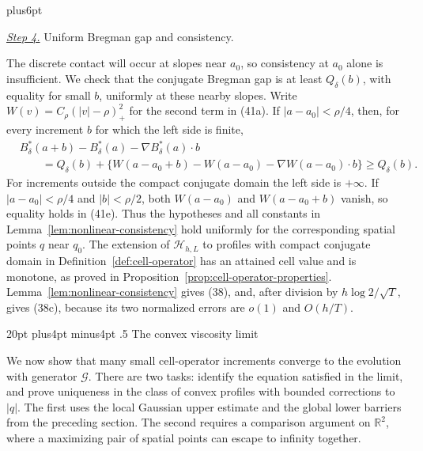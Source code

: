 \documentclass[11pt,reqno]{amsart}
\makeatletter
\def\section{\@startsection{section}{1}{0pt}%
  {20pt plus4pt minus4pt}
  {.5\linespacing}
  {\normalfont\bfseries}}
\theoremstyle{plain}
\theoremstyle{definition}
\theoremstyle{remark}
\renewenvironment{proof}[1][\proofname]{%
  \par
  \pushQED{\qed}%
  \normalfont
  \topsep6pt plus6pt\relax
  \trivlist
  \item[\hskip\labelsep\slshape #1\@addpunct{.}]%
  \ignorespaces
}{%
  \popQED
  \endtrivlist
  \@endpefalse
}
\DeclareRobustCommand{\qed}{%
  \leavevmode\unskip\penalty9999\hbox{}\nobreak
  \ifmmode
    \makebox[0pt][l]{\qquad\hbox{\qedsymbol}}%
  \else
    \qquad\hbox{\qedsymbol}%
  \fi
}
\renewcommand{\qedsymbol}{\rule[.47pt]{4pt}{6pt}}
\numberwithin{equation}{section}
\newcommand{\1}{\mathbf 1}
\makeatother
\begin{document}
\begin{proof}
\smallskip\noindent
\underline{\textit{Step 4.}} Uniform Bregman gap and consistency.

The discrete contact will occur at slopes near $a_0$, so consistency
at $a_0$ alone is insufficient.  We check that the conjugate Bregman
gap is at least $Q_\delta(b)$, with equality for small $b$, uniformly
at these nearby slopes.  Write
$W(v)=C_\rho(|v|-\rho)_+^2$ for the second term in (41a).
If $|a-a_0|<\rho/4$, then, for every increment
$b$ for which the left side is finite,
\begin{equation}
\begin{split}
&B_ \delta^*(a+b)-B_ \delta^*(a)
-\nabla B_ \delta^*(a)\cdot b\\
&\qquad=Q_ \delta(b)+
\{W(a-a_ 0+b)-W(a-a_ 0)-\nabla W(a-a_ 0)\cdot b\}
\geq Q_ \delta(b).                                             
\end{split}
\tag{41e}
\end{equation}
For increments outside the compact conjugate domain the left side is
$+\infty$.  If $|a-a_0|<\rho/4$ and $|b|<\rho/2$, both
$W(a-a_0)$ and $W(a-a_0+b)$ vanish, so equality holds in (41e).
Thus the hypotheses and all
constants in Lemma~\ref{lem:nonlinear-consistency} hold uniformly for the
corresponding spatial points $q$ near $q_ 0$.  The extension of
$\mathcal H_{h,L}$ to profiles with compact conjugate domain in
Definition~\ref{def:cell-operator} has an attained cell value and is
monotone, as proved in
Proposition~\ref{prop:cell-operator-properties}.
Lemma~\ref{lem:nonlinear-consistency} gives
(38), and, after division by $h\log2/\sqrt T$, gives (38c), because
its two normalized errors are $o(1)$ and $O(h/T)$.

\end{proof}

\section{The convex viscosity limit}\label{sec:viscosity}

We now show that many small cell-operator increments converge to the
evolution with generator $\mathcal G$.  There are two tasks: identify
the equation satisfied in the limit, and prove uniqueness in the class
of convex profiles with bounded corrections to $|q|$.  The first uses
the local Gaussian upper estimate and the global lower barriers from
the preceding section.  The second requires a comparison argument on
$\mathbb R^2$, where a maximizing pair of spatial points can escape
to infinity together.
\end{document}
